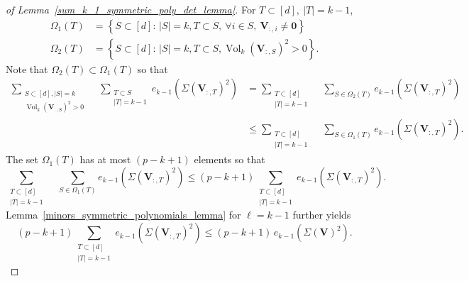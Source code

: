 \documentclass[twoside,11pt]{book}
\numberwithin{theorem}{chapter}
\numberwithin{definition}{chapter}
\numberwithin{proposition}{chapter}
\numberwithin{corollary}{chapter}
\numberwithin{example}{chapter}
\numberwithin{lemma}{chapter}
\numberwithin{assumption}{chapter}
\numberwithin{equation}{chapter}
\numberwithin{figure}{chapter}
\DeclareMathOperator{\Vol}{Vol}
\begin{document}
\begin{proof}[of Lemma~\ref{sum_k_1_symmetric_poly_det_lemma}]
For $T \subset [d], \: |T| = k-1$,
\begin{align*}
    \Omega_{1}(T) &= \left\{ S \subset[d]:\, |S| = k, T \subset S,\ \forall i \in S ,\ \bm{V}_{:,i} \neq \bm{0} \right\}\\
    \Omega_{2}(T) &= \left\{ S \subset[d] :\, |S| = k, T \subset S, \Vol_{k}(\bm{V}_{:,S})^{2} >0   \right\}.
\end{align*}
Note that $\Omega_{2}(T) \subset \Omega_{1}(T)$ so that
\begin{align*}
        \sum\limits_{\substack{S \subset [d], |S| = k\\\Vol_{k}(\bm{V}_{:,S})^{2} >0}} \quad \sum\limits_{\substack{T \subset S\\ |T| = k-1}} e_{k-1}(\Sigma(\bm{V}_{:,T})^{2})
        & = \sum\limits_{\substack{T \subset [d]\\ |T| = k-1}} \quad \sum\limits_{S \in \Omega_{2}(T)} e_{k-1}(\Sigma(\bm{V}_{:,T})^{2}) \\
        & \leq \sum\limits_{\substack{T \subset [d]\\ |T| = k-1}} \quad \sum\limits_{S \in \Omega_{1}(T)} e_{k-1}(\Sigma(\bm{V}_{:,T})^{2}).
\end{align*}
The set $\Omega_{1}(T)$ has at most $(p-k+1)$ elements so that
\begin{equation}
\sum\limits_{\substack{T \subset [d]\\ |T| = k-1}} \quad \sum\limits_{S \in \Omega_{1}(T)} e_{k-1}(\Sigma(\bm{V}_{:,T})^{2}) \leq (p-k+1)\sum\limits_{\substack{T \subset [d]\\ |T| = k-1}}  e_{k-1}(\Sigma(\bm{V}_{:,T})^{2}).
\end{equation}
Lemma~\ref{minors_symmetric_polynomials_lemma} for $\ell=k-1$ further yields
\begin{equation}
(p-k+1)\sum\limits_{\substack{T \subset [d]\\ |T| = k-1}}  e_{k-1}(\Sigma(\bm{V}_{:,T})^{2}) \leq (p-k+1)\,e_{k-1}(\Sigma(\bm{V})^{2}).
\end{equation}
\end{proof}

\end{document}
